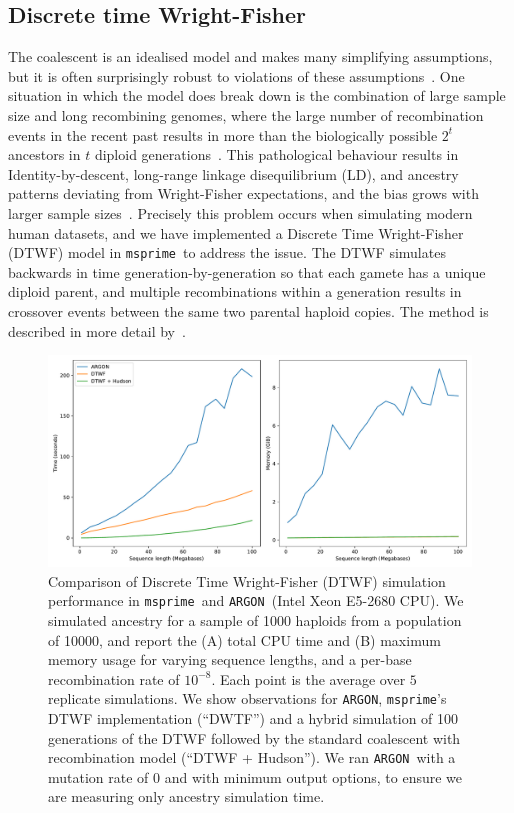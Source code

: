 \documentclass{article}
\newcommand{\msprime}[0]{\texttt{msprime}}
\newcommand{\ARGON}[0]{\texttt{ARGON}}
\begin{document}
\subsection*{Discrete time Wright-Fisher}
The coalescent is an idealised model and makes many simplifying assumptions,
but it is often surprisingly robust to violations of these
assumptions~\citep{wakeley2012gene}. One situation in which the
model does break down is the combination of large sample size
and long recombining genomes, where the large
number of recombination events in the recent past results in
more than the biologically possible $2^t$ ancestors in
$t$ diploid generations~\citep{nelson2020accounting}.
This pathological behaviour results in
Identity-by-descent,
long-range linkage disequilibrium (LD), and ancestry patterns deviating from
Wright-Fisher expectations, and the bias grows with larger sample
sizes~\citep{wakeley2012gene,bhaskar2014distortion,nelson2020accounting}.
Precisely this problem occurs when simulating modern human datasets,
and we have implemented a Discrete Time Wright-Fisher (DTWF) model
in \msprime\ to address the issue. The DTWF simulates backwards in
time generation-by-generation so that each gamete has a unique
diploid parent, and multiple recombinations within a generation results in
crossover events between the same two parental haploid copies.
The method is described in more detail by~\cite{nelson2020accounting}.

\begin{figure}
\begin{center}
\includegraphics[width=\textwidth]{figures/dtwf-perf}
\end{center}
\caption{\label{fig-dtwf-perf} Comparison of Discrete Time Wright-Fisher
(DTWF) simulation performance in \msprime\ and \ARGON\ (Intel Xeon E5-2680 CPU).
We simulated ancestry for a sample of 1000 haploids from a population of 10000,
and report the (A) total CPU time and (B) maximum memory usage for varying
sequence lengths, and a per-base recombination rate of $10^{-8}$. Each
point is the average over $5$ replicate simulations.
We show observations for \ARGON, \msprime's DTWF implementation (``DWTF'')
and a hybrid simulation of 100 generations of the DTWF followed by
the standard coalescent with recombination model (``DTWF + Hudson'').
We ran \ARGON\ with a mutation rate of $0$ and with minimum output options,
to ensure we are measuring only ancestry simulation time.}
\end{figure}
\end{document}
